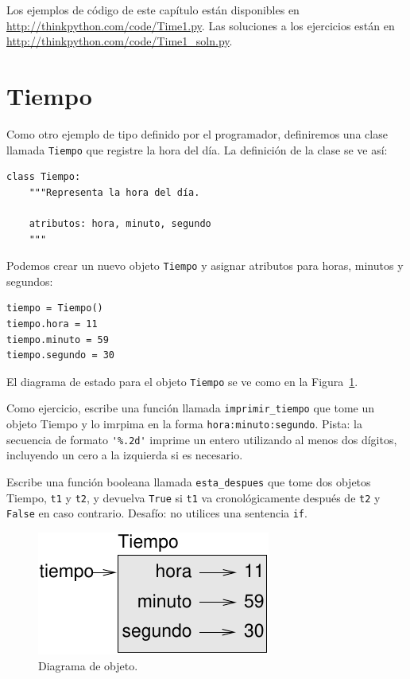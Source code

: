 \documentclass[10pt]{book}
\begin{document}
Los ejemplos de código de este capítulo están disponibles en
\url{http://thinkpython.com/code/Time1.py}.
Las soluciones a los ejercicios están en
\url{http://thinkpython.com/code/Time1_soln.py}.


\section{Tiempo}
\label{isafter}

Como otro ejemplo de tipo definido por el programador, definiremos una clase
llamada {\tt Tiempo} que registre la hora del día.  La definición de la clase
se ve así: 
  

\begin{verbatim}
class Tiempo:
    """Representa la hora del día.

    atributos: hora, minuto, segundo
    """
\end{verbatim}
%
Podemos crear un nuevo objeto {\tt Tiempo} y asignar
atributos para horas, minutos y segundos:

\begin{verbatim}
tiempo = Tiempo()
tiempo.hora = 11
tiempo.minuto = 59
tiempo.segundo = 30
\end{verbatim}
%
El diagrama de estado para el objeto {\tt Tiempo} se ve como en la Figura~\ref{fig.time}.

Como ejercicio, escribe una función llamada \verb"imprimir_tiempo" que tome un
objeto Tiempo y lo imrpima en la forma {\tt hora:minuto:segundo}.
Pista: la secuencia de formato \verb"'%.2d'" imprime un entero utilizando
al menos dos dígitos, incluyendo un cero a la izquierda si es necesario.

Escribe una función booleana llamada \verb"esta_despues" que
tome dos objetos Tiempo, {\tt t1} y {\tt t2}, y
devuelva {\tt True} si {\tt t1} va cronológicamente después de {\tt t2} y
{\tt False} en caso contrario.  Desafío: no utilices una sentencia {\tt if}.

\begin{figure}
\centerline
{\includegraphics[scale=0.8]{figs/time.pdf}}
\caption{Diagrama de objeto.}
\label{fig.time}
\end{figure}
\end{document}
